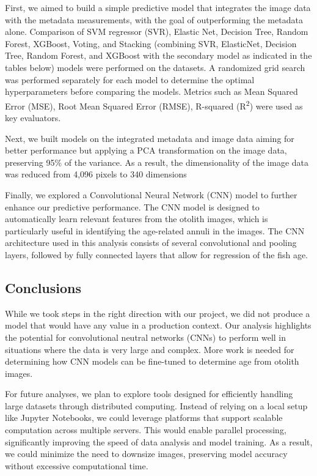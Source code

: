 First, we aimed to build a simple predictive model that integrates the image data with the metadata measurements, with the goal of outperforming the metadata alone.
Comparison of SVM regressor (SVR), Elastic Net, Decision Tree, Random Forest, XGBoost, Voting, and Stacking (combining SVR, ElasticNet, Decision Tree, Random Forest, and XGBoost with the secondary model as indicated in the tables below) models were performed on the datasets.
A randomized grid search was performed separately for each model to determine the optimal hyperparameters before comparing the models.
Metrics such as Mean Squared Error (MSE), Root Mean Squared Error (RMSE), R-squared (R\textsuperscript{2}) were used as key evaluators.

Next, we built models on the integrated metadata and image data aiming for better performance but applying a PCA transformation on the image data, preserving 95\% of the variance.
As a result, the dimensionality of the image data was reduced from 4,096 pixels to 340 dimensions

Finally, we explored a Convolutional Neural Network (CNN) model to further enhance our predictive performance.
The CNN model is designed to automatically learn relevant features from the otolith images, which is particularly useful in identifying the age-related annuli in the images.
The CNN architecture used in this analysis consists of several convolutional and pooling layers, followed by fully connected layers that allow for regression of the fish age.

\subsection{Conclusions}

While we took steps in the right direction with our project, we did not produce a model that would have any value in a production context.
Our analysis highlights the potential for convolutional neutral networks (CNNs) to perform well in situations where the data is very large and complex.
More work is needed for determining how CNN models can be fine-tuned to determine age from otolith images.

For future analyses, we plan to explore tools designed for efficiently handling large datasets through distributed computing.
Instead of relying on a local setup like Jupyter Notebooks, we could leverage platforms that support scalable computation across multiple servers.
This would enable parallel processing, significantly improving the speed of data analysis and model training.
As a result, we could minimize the need to downsize images, preserving model accuracy without excessive computational time.


